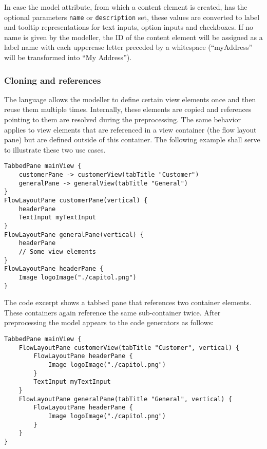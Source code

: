 In case the model attribute, from which a content element is created, has the optional parameters \lstinline!name! or \lstinline!description! set, these values are converted to label and tooltip representations for text inputs, option inputs and checkboxes. If no name is given by the modeller, the ID of the content element will be assigned as a label name with each uppercase letter preceded by a whitespace (\eg \enquote{myAddress} will be transformed into \enquote{My Address}).

\subsubsection{Cloning and references}
The \MD language allows  the modeller to define certain view elements once and then reuse them multiple times. Internally, these elements are copied and references pointing to them are resolved during the preprocessing. The same behavior applies to view elements that are referenced in a view container (\eg the flow layout pane) but are defined outside of this container. The following example shall serve to illustrate these two use cases.

\begin{lstlisting}[language=MD2]
TabbedPane mainView {
	customerPane -> customerView(tabTitle "Customer")
	generalPane -> generalView(tabTitle "General")
}
FlowLayoutPane customerPane(vertical) {
	headerPane
	TextInput myTextInput
}
FlowLayoutPane generalPane(vertical) {
	headerPane
	// Some view elements
}
FlowLayoutPane headerPane {
	Image logoImage("./capitol.png")
}
\end{lstlisting}

The code excerpt shows a tabbed pane that references two container elements. These containers again reference the same sub-container twice. After preprocessing the model appears to the code generators as follows:

\begin{lstlisting}[language=MD2]
TabbedPane mainView {
	FlowLayoutPane customerView(tabTitle "Customer", vertical) {
		FlowLayoutPane headerPane {
			Image logoImage("./capitol.png")
	    }
		TextInput myTextInput
	}
	FlowLayoutPane generalPane(tabTitle "General", vertical) {
		FlowLayoutPane headerPane {
			Image logoImage("./capitol.png")
		}
	}
}
\end{lstlisting}

